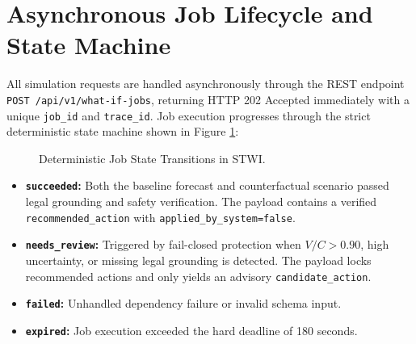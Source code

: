\section{Asynchronous Job Lifecycle and State Machine}
All simulation requests are handled asynchronously through the REST endpoint \texttt{POST /api/v1/what-if-jobs}, returning HTTP 202 Accepted immediately with a unique \texttt{job\_id} and \texttt{trace\_id}. Job execution progresses through the strict deterministic state machine shown in Figure \ref{fig:job_states}:

\begin{figure}[H]
\centering
{}
\caption{Deterministic Job State Transitions in STWI.}
\label{fig:job_states}
\end{figure}

\begin{itemize}[leftmargin=1.5cm, label=--]
  \item \textbf{\texttt{succeeded}:} Both the baseline forecast and counterfactual scenario passed legal grounding and safety verification. The payload contains a verified \texttt{recommended\_action} with \texttt{applied\_by\_system=false}.
  \item \textbf{\texttt{needs\_review}:} Triggered by fail-closed protection when $V/C > 0.90$, high uncertainty, or missing legal grounding is detected. The payload locks recommended actions and only yields an advisory \texttt{candidate\_action}.
  \item \textbf{\texttt{failed}:} Unhandled dependency failure or invalid schema input.
  \item \textbf{\texttt{expired}:} Job execution exceeded the hard deadline of 180 seconds.
\end{itemize}
